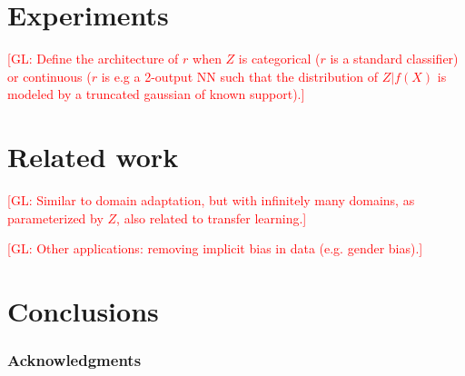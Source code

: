 \documentclass{article}
\newcommand{\glnote}[1]{\textcolor{red}{[GL: #1]}}
\theoremstyle{plain}
\begin{document}

\section{Experiments}

\glnote{Define the architecture of $r$ when $Z$ is categorical ($r$ is a
standard classifier) or continuous ($r$ is e.g a 2-output NN such that the
distribution of $Z|f(X)$ is modeled by a truncated gaussian of known support).}



\section{Related work}

\glnote{Similar to domain adaptation, but with infinitely many domains,
as parameterized by $Z$, also related to transfer learning.}

\glnote{Other applications: removing implicit bias in data (e.g. gender bias).}



\section{Conclusions}



\subsubsection*{Acknowledgments}



\end{document}
